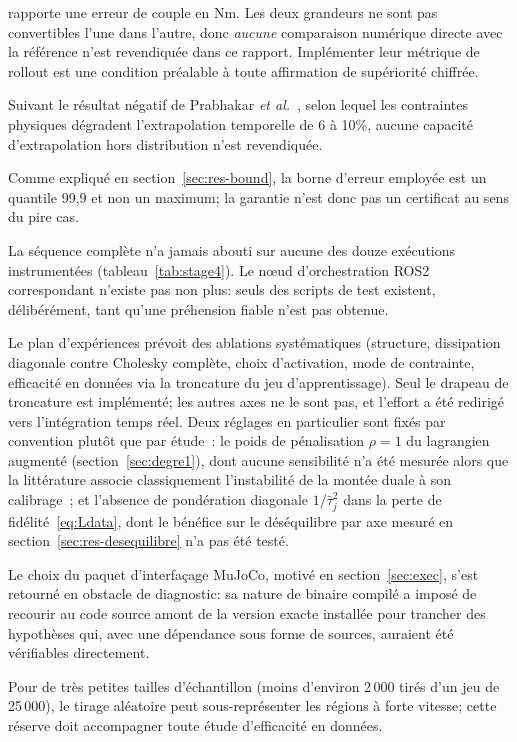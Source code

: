 \documentclass[a4paper, oneside]{article}
\begin{document}
\begin{description}
    rapporte une erreur de couple en Nm. Les deux grandeurs ne sont pas
    convertibles l'une dans l'autre, donc \emph{aucune} comparaison numérique
    directe avec la référence n'est revendiquée dans ce rapport. Implémenter
    leur métrique de rollout est une condition préalable à toute affirmation de
    supériorité chiffrée.
    \item[Portée restreinte aux trajectoires en distribution.] Suivant le
    résultat négatif de Prabhakar \emph{et al.}~\cite{prabhakar2026}, selon
    lequel les contraintes physiques dégradent l'extrapolation temporelle de 6
    à 10\%, aucune capacité d'extrapolation hors distribution n'est revendiquée.
    \item[Certificat de stabilité affaibli.] Comme expliqué en
    section~\ref{sec:res-bound}, la borne d'erreur employée est un quantile
    99{,}9 et non un maximum; la garantie n'est donc pas un certificat au sens
    du pire cas.
    \item[Tâche de préhension non fonctionnelle.] La séquence complète n'a
    jamais abouti sur aucune des douze exécutions instrumentées
    (tableau~\ref{tab:stage4}). Le n\oe ud d'orchestration ROS2 correspondant
    n'existe pas non plus: seuls des scripts de test existent,
    délibérément, tant qu'une préhension fiable n'est pas obtenue.
    \item[Matrice d'ablation incomplète.] Le plan d'expériences prévoit des
    ablations systématiques (structure, dissipation diagonale contre Cholesky
    complète, choix d'activation, mode de contrainte, efficacité en données via
    la troncature du jeu d'apprentissage). Seul le drapeau de troncature est
    implémenté; les autres axes ne le sont pas, et l'effort a été redirigé
    vers l'intégration temps réel. Deux réglages en particulier sont fixés par
    convention plutôt que par étude~: le poids de pénalisation $\rho = 1$ du
    lagrangien augmenté (section~\ref{sec:degre1}), dont aucune sensibilité
    n'a été mesurée alors que la littérature associe classiquement
    l'instabilité de la montée duale à son calibrage~; et l'absence de
    pondération diagonale $1/\bar{\tau}_j^2$ dans la perte de
    fidélité~\eqref{eq:Ldata}, dont le bénéfice sur le déséquilibre par axe
    mesuré en section~\ref{sec:res-desequilibre} n'a pas été testé.
    \item[Opacité d'une dépendance binaire.] Le choix du paquet
    d'interfaçage MuJoCo, motivé en section~\ref{sec:exec}, s'est retourné en
    obstacle de diagnostic: sa nature de binaire compilé a imposé de recourir
    au code source amont de la version exacte installée pour trancher des
    hypothèses qui, avec une dépendance sous forme de sources, auraient été
    vérifiables directement.
    \item[Sous-échantillonnage possible en régime d'ablation.] Pour de très
    petites tailles d'échantillon (moins d'environ 2\,000 tirés d'un jeu de
    25\,000), le tirage aléatoire peut sous-représenter les régions à forte
    vitesse; cette réserve doit accompagner toute étude d'efficacité en
    données.
\end{description}
\end{document}
